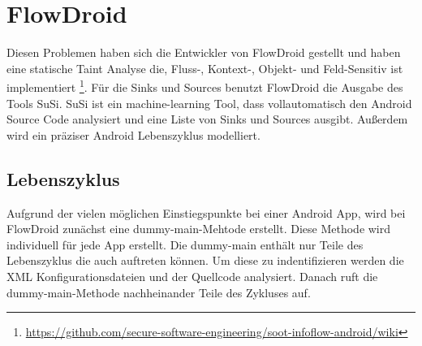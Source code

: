 \documentclass[runningheads]{llncs}
\begin{document}
\section{FlowDroid}
Diesen Problemen haben sich die Entwickler von FlowDroid gestellt und haben eine statische Taint Analyse die, Fluss-, Kontext-, Objekt- und Feld-Sensitiv ist implementiert \footnote{\url{https://github.com/secure-software-engineering/soot-infoflow-android/wiki}}.
Für die Sinks und Sources benutzt FlowDroid die Ausgabe des Tools SuSi. SuSi ist ein machine-learning Tool, dass vollautomatisch den Android Source Code analysiert und eine Liste von Sinks und Sources ausgibt. Außerdem wird ein präziser Android Lebenszyklus modelliert.
\subsection{Lebenszyklus}
Aufgrund der vielen möglichen Einstiegspunkte bei einer Android App, wird bei FlowDroid zunächst eine dummy-main-Mehtode erstellt. Diese Methode wird individuell für jede App erstellt. Die dummy-main enthält nur Teile des Lebenszyklus die auch auftreten können. Um diese zu indentifizieren werden die XML Konfigurationsdateien und der Quellcode analysiert. Danach ruft die dummy-main-Methode nachheinander Teile des Zykluses auf.
\end{document}
